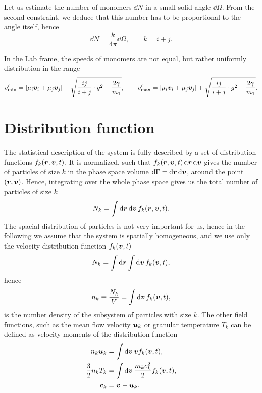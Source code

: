 \documentclass[aps,prl,preprint,groupedaddress,10pt]{revtex4-2}
\begin{document}
Let us estimate the number of monomers $\dd{N}$ in a small solid angle $\dd{\Omega}$.
From the second constraint, we deduce that this number has to be proportional to the 
angle itself, hence 
\begin{equation}
    \dd{N}=\frac{k}{4\pi}\dd{\Omega},\qquad k=i+j.
\end{equation}

In the Lab frame, the speeds of monomers are not equal, but rather uniformly 
distribution in the range 
\begin{equation}
    v'_{\mathrm{min}}=\abs{\mu_i\vb*{v}_i+\mu_j\vb*{v}_j}-
    \sqrt{\frac{ij}{i+j}\cdot g^2-\frac{2\gamma}{m_1}},\qquad
    v'_{\mathrm{max}}=\abs{\mu_i\vb*{v}_i+\mu_j\vb*{v}_j}+
    \sqrt{\frac{ij}{i+j}\cdot g^2-\frac{2\gamma}{m_1}}.
\end{equation}

\section{Distribution function}
The statistical description of the system is fully described by a set of distribution
functions $f_k\pqty{\br,\bv,t}$. It is normalized, such that 
$f_k\pqty{\br,\bv,t}\dd{\br}\dd{\bv}$ gives the number of particles of size $k$
in the phase space volume $\dd{\Gamma}=\dd{\vb*{r}}\dd{\vb*{v}}$, around the point 
$\pqty{\br,\bv}$. Hence, integrating over the whole phase space gives us the total
number of particles of size $k$
\begin{equation}
    N_k=\int\dd{\br}\dd{\bv}f_k\pqty{\br,\bv,t}.
\end{equation}
The spacial distribution of particles is not very important for us, hence in the following
we assume that the system is spatially homogeneous, and we use only the velocity
distribution function $f_k\pqty{\bv,t}$
\begin{equation}
    N_k=\int\dd{\br}\int\dd{\bv}f_k\pqty{\bv,t},
\end{equation}
hence 
\begin{equation}
    n_k\equiv\frac{N_k}{V}=\int\dd{\bv}f_k\pqty{\bv,t},
\end{equation}
is the number density of the subsystem of particles with size $k$. The other field 
functions, such as the mean flow velocity $\vb*{u}_k$ or granular temperature $T_k$ 
can be defined as velocity moments of the distribution function
\begin{equation}
    \begin{split}
        n_k\bu_k &= \int\dd{\bv}\bv f_k\pqty{\bv,t},\\
        \frac{3}{2}n_kT_k &=\int\dd{\bv}\frac{m_kc_k^2}{2}f_k\pqty{\bv,t},\\
        \bc_k &= \bv-\bu_k.
    \end{split}
\end{equation}
\end{document}
